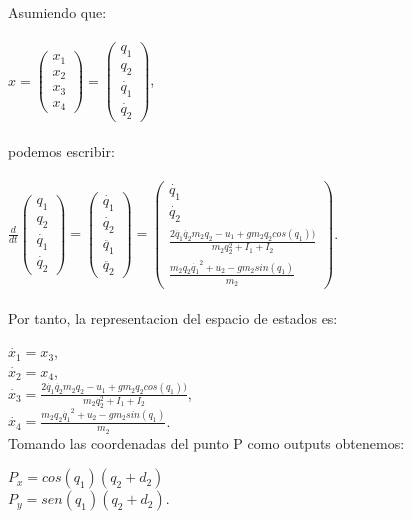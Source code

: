 \documentclass{article}
\begin{document}
\begin{itemize}
 \bigskip
Asumiendo que:\\\\
		$x = 
			\begin{pmatrix}
				 x_1\\x_2\\x_3\\x_4
			\end{pmatrix}
		 		= 
			\begin{pmatrix}
				 q_1\\q_2\\\dot{q_1}\\\dot{q_2}
			\end{pmatrix}$,\\\\
podemos escribir:\\\\
		$\frac{d}{dt}
			\begin{pmatrix}
				 q_1\\q_2\\\dot{q_1}\\\dot{q_2}
			\end{pmatrix}
				=
			\begin{pmatrix}
				 \dot{q_1}\\\dot{q_2}\\\ddot{q_1}\\\ddot{q_2}
			\end{pmatrix}
				=
			\begin{pmatrix}
				 \dot{q_1}\\\dot{q_2}\\\frac{2\dot{q_1}\dot{q_2}m_2q_2 - u_1 + gm_2q_2cos(q_1))}{m_2q_2^2 + I_1 + I_2}\\\frac{m_2q_2\dot{q_1}^2 + u_2 - gm_2sin(q_1)}{m_2}
			\end{pmatrix}$.\\\\
Por tanto, la representacion del espacio de estados es:

	$\dot{x_1}=x_3$,\\
	$\dot{x_2}=x_4$,\\
	$\dot{x_3}=\frac{2\dot{q_1}\dot{q_2}m_2q_2 - u_1 + gm_2q_2cos(q_1))}{m_2q_2^2 + I_1 + I_2}$,\\
	$\dot{x_4}=\frac{m_2q_2\dot{q_1}^2 + u_2 - gm_2sin(q_1)}{m_2}$.\\
	
Tomando las coordenadas del punto P como outputs obtenemos:

$P_x = cos(q_1)(q_2+d_2)$\\
$P_y = sen(q_1)(q_2+d_2)$.
\bigskip
 

\end{itemize}
\end{document}
